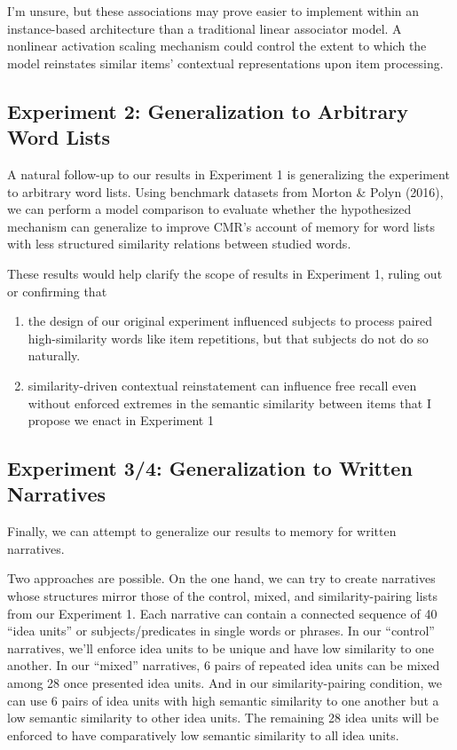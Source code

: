 \documentclass[
  english,
  11pt,
  letterpaper,
]{article}
\providecommand{\tightlist}{%
  \setlength{\itemsep}{0pt}\setlength{\parskip}{0pt}}
\begin{document}
I'm unsure, but these associations may prove easier to implement within
an instance-based architecture than a traditional linear associator
model. A nonlinear activation scaling mechanism could control the extent
to which the model reinstates similar items' contextual representations
upon item processing.

\subsection{Experiment 2: Generalization to Arbitrary Word
Lists}\label{experiment-2-generalization-to-arbitrary-word-lists}

A natural follow-up to our results in Experiment 1 is generalizing the
experiment to arbitrary word lists. Using benchmark datasets from Morton
\& Polyn (2016), we can perform a model comparison to evaluate whether
the hypothesized mechanism can generalize to improve CMR's account of
memory for word lists with less structured similarity relations between
studied words.

These results would help clarify the scope of results in Experiment 1,
ruling out or confirming that

\begin{enumerate}
\def\labelenumi{\arabic{enumi}.}
\tightlist
\item
  the design of our original experiment influenced subjects to process
  paired high-similarity words like item repetitions, but that subjects
  do not do so naturally.
\item
  similarity-driven contextual reinstatement can influence free recall
  even without enforced extremes in the semantic similarity between
  items that I propose we enact in Experiment 1
\end{enumerate}

\subsection{Experiment 3/4: Generalization to Written
Narratives}\label{experiment-34-generalization-to-written-narratives}

Finally, we can attempt to generalize our results to memory for written
narratives.

Two approaches are possible. On the one hand, we can try to create
narratives whose structures mirror those of the control, mixed, and
similarity-pairing lists from our Experiment 1. Each narrative can
contain a connected sequence of 40 ``idea units'' or subjects/predicates
in single words or phrases. In our ``control'' narratives, we'll enforce
idea units to be unique and have low similarity to one another. In our
``mixed'' narratives, 6 pairs of repeated idea units can be mixed among
28 once presented idea units. And in our similarity-pairing condition,
we can use 6 pairs of idea units with high semantic similarity to one
another but a low semantic similarity to other idea units. The remaining
28 idea units will be enforced to have comparatively low semantic
similarity to all idea units.
\end{document}
